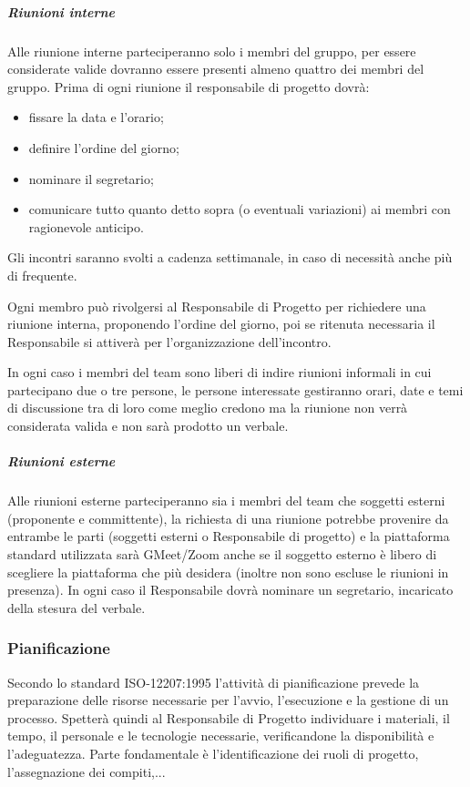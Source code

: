 \subparagraph{Riunioni interne}
Alle riunione interne parteciperanno solo i membri del gruppo, per essere considerate valide dovranno essere presenti almeno quattro dei membri del gruppo. Prima di ogni riunione il responsabile di progetto dovrà:
\begin{itemize}
\item fissare la data e l'orario;
\item definire l'ordine del giorno;
\item nominare il segretario;
\item comunicare tutto quanto detto sopra (o eventuali variazioni) ai membri con ragionevole anticipo.
\end{itemize}
Gli incontri saranno svolti a cadenza settimanale, in caso di necessità anche più di frequente.

Ogni membro può rivolgersi al Responsabile di Progetto per richiedere una riunione interna, proponendo l'ordine del giorno, poi se ritenuta necessaria il Responsabile si attiverà per l'organizzazione dell'incontro.

In ogni caso i membri del team sono liberi di indire riunioni informali in cui partecipano due o tre persone, le persone interessate gestiranno orari, date e temi di discussione tra di loro come meglio credono ma la riunione non verrà considerata valida e non sarà prodotto un verbale.

\subparagraph{Riunioni esterne}
Alle riunioni esterne parteciperanno sia i membri del team che soggetti esterni (proponente e committente), la richiesta di una riunione potrebbe provenire da entrambe le parti (soggetti esterni o Responsabile di progetto) e la piattaforma standard utilizzata sarà GMeet/Zoom anche se il soggetto esterno è libero di scegliere la piattaforma che più desidera (inoltre non sono escluse le riunioni in presenza). In ogni caso il Responsabile dovrà nominare un segretario, incaricato della stesura del verbale.


\subsubsection{Pianificazione}
Secondo lo standard ISO-12207:1995 l'attività di pianificazione prevede la preparazione delle risorse necessarie per l'avvio, l'esecuzione e la gestione di un processo. Spetterà quindi al Responsabile di Progetto individuare i materiali, il tempo, il personale e le tecnologie necessarie, verificandone la disponibilità e l'adeguatezza. Parte fondamentale è l'identificazione dei ruoli di progetto, l'assegnazione dei compiti,...

